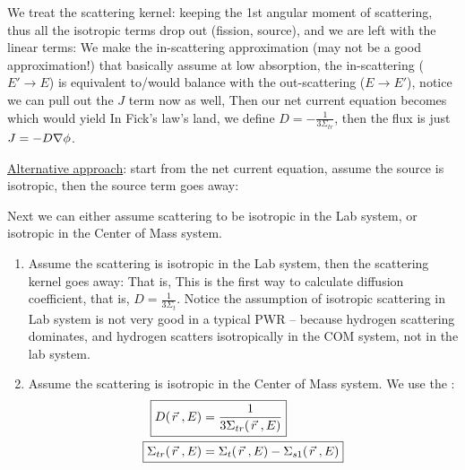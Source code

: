 \documentclass{school-22.211-notes}
\begin{document}
\clearpage
{}
We treat the scattering kernel: keeping the 1st angular moment of scattering, thus all the isotropic terms drop out (fission, source), and we are left with the linear terms: 
We make the in-scattering approximation (may not be a good approximation!) that basically assume at low absorption, the in-scattering ($E'\to E$) is equivalent to/would balance with the out-scattering ($E \to E'$), notice we can pull out the $J$ term now as well,  
Then our net current equation becomes
which would yield
In Fick's law's land, we define $\displaystyle D = - \frac{1}{3 \Sigma_{tr}}$, then the flux is just $J = - D \nabla \phi$. 



\uline{Alternative approach}: start from the net current equation, assume the source is isotropic, then the source term goes away:

Next we can either assume scattering to be isotropic in the Lab system, or isotropic in the Center of Mass system. 
\begin{enumerate}
\item Assume the scattering is isotropic in the Lab system, then the scattering kernel goes away:
That is, 
This is the first way to calculate diffusion coefficient, that is, $D = \frac{1}{3 \Sigma_t}$. Notice the assumption of isotropic scattering in Lab system is not very good in a typical PWR -- because hydrogen scattering dominates, and hydrogen scatters isotropically in the COM system, not in the lab system. 


\item Assume the scattering is isotropic in the Center of Mass system. We use the :
\begin{align}
  \Aboxed{ D(\vecr, E) &= \frac{1}{3 \Sigma_{tr} (\vecr, E) } } \\
  \Aboxed{ \Sigma_{tr} (\vecr, E) &= \Sigma_t(\vecr, E) - \Sigma_{s1} (\vecr, E) } 
\end{align} 
\end{enumerate}
\end{document}
